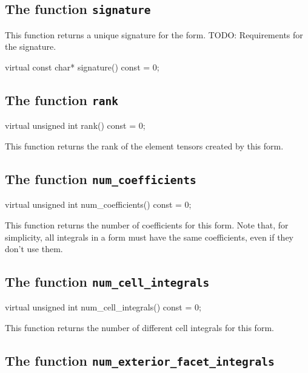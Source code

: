 \subsection{The function \texttt{signature}}

This function returns a unique signature for the form.
TODO: Requirements for the signature.

\begin{code}
virtual const char* signature() const = 0;
\end{code}

\subsection{The function \texttt{rank}}

\begin{code}
virtual unsigned int rank() const = 0;
\end{code}

This function returns the rank of the element tensors created by this form.

\subsection{The function \texttt{num\_coefficients}}

\begin{code}
virtual unsigned int num_coefficients() const = 0;
\end{code}

This function returns the number of coefficients for this form.
Note that, for simplicity, all integrals in a form must have
the same coefficients, even if they don't use them.

\subsection{The function \texttt{num\_cell\_integrals}}

\begin{code}
virtual unsigned int num_cell_integrals() const = 0;
\end{code}

This function returns the number of different cell integrals for this form.

\subsection{The function \texttt{num\_exterior\_facet\_integrals}}

